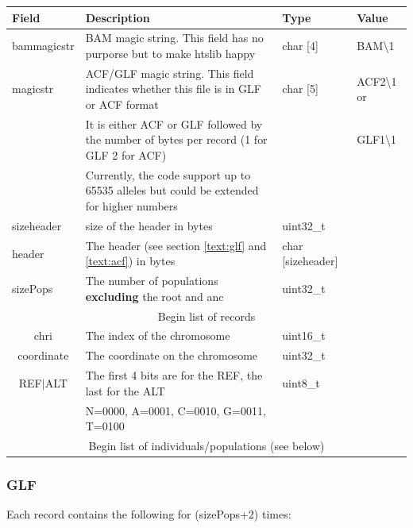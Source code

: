 \documentclass[a4paper]{article}
\begin{document}
\noindent \begin{tabular}{|l|p{5cm}|l|l|}
\hline
{\bf Field} & {\bf Description} & {\bf Type} & {\bf Value} \\
\hline
bammagicstr & BAM magic string. This field has no purporse but to make htslib happy & char [4] & BAM\textbackslash1 \\
\hline
magicstr & ACF/GLF magic string. This field indicates whether this file is in GLF or ACF format & char [5] & ACF2\textbackslash1 or \\
         &  It is either ACF or GLF followed by the number of bytes per record (1 for GLF 2 for ACF)   &          & GLF1\textbackslash1 \\
         &  Currently, the code support up to 65535 alleles but could be extended for higher numbers   &          &  \\
\hline
sizeheader & size of the header in bytes   & uint32\_t         & \\
\hline
header     & The header (see section \ref{text:glf} and \ref{text:acf}) in bytes           & char [sizeheader] & \\
\hline
sizePops   & The number of populations {\bf excluding}  the root and anc & uint32\_t         & \\
\hline
\multicolumn{4}{|c|}{Begin list of records} \\
\hline
\multicolumn{1}{|c|}{chri}   & The index of the chromosome & uint16\_t         & \\
\hline
\multicolumn{1}{|c|}{coordinate}   & The coordinate on the chromosome & uint32\_t         & \\
\hline
\multicolumn{1}{|c|}{REF$\vert$ALT}     & The first 4 bits are for the REF, the last for the ALT & uint8\_t         & \\
                                & N=0000, A=0001, C=0010, G=0011, T=0100                  &          & \\
\hline
\multicolumn{4}{|c|}{Begin list of individuals/populations (see below)} \\
\hline
\end{tabular}

\afterpage{\clearpage}


\subsubsection{GLF}

\noindent Each record contains the following for (sizePops+2) times:
\end{document}
